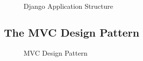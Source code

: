 \documentclass[12pt,a4paper,class,twoside,openany]{report}
\begin{document}
\begin{figure}
\begin{center}
\caption{Django Application Structure}
\label{fg:3-14}
\end{center}
\end{figure}

\subsection{The MVC Design Pattern}
 \begin{figure}
\begin{center}
\caption{ MVC Design Pattern}
\label{fg:3-4}
\end{center}
\end{figure}
\end{document}
